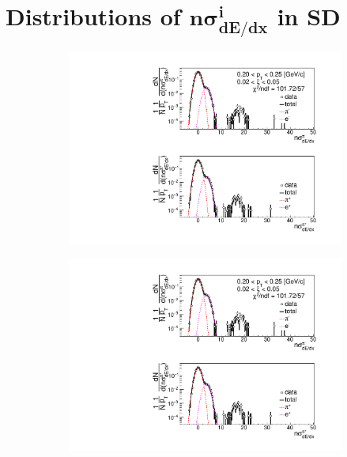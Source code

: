\chapter[Distributions of $n\sigma^{i}_{dE/dx}$ in SD]{Distributions of $\mathbf{n\sigma^{i}_{dE/dx}}$ in SD}\label{appendix:dEdxFits}
\begin{figure}[h!]
	\centering
	\begin{subfigure}{.33\textwidth}
		\includegraphics[width=\linewidth, page=1]{chapters/chrgSTAR/img/dEdx/fit2019_secondStep_0_0.pdf}
	\end{subfigure}
	\begin{subfigure}{.33\textwidth}
		\includegraphics[width=\linewidth, page=2]{chapters/chrgSTAR/img/dEdx/fit2019_secondStep_0_0.pdf}
	\end{subfigure}
	\begin{subfigure}{.3\textwidth}

\end{subfigure}
\end{figure}
